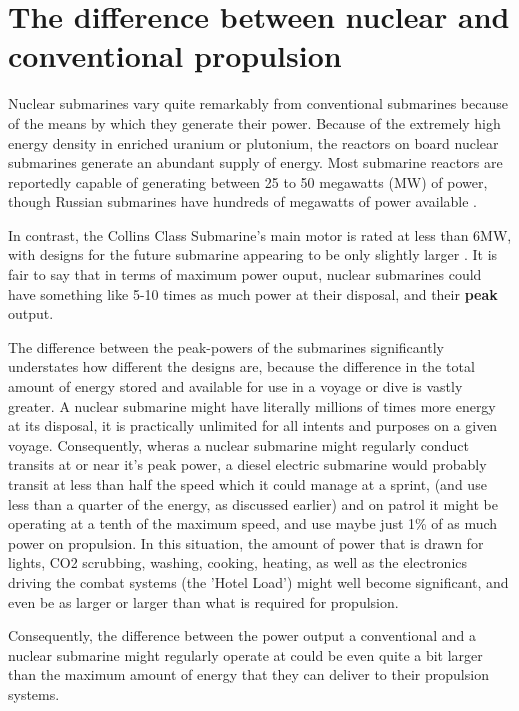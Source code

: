 \documentclass{article}\usepackage[]{graphicx}\usepackage[]{color}
\begin{document}
\section{The difference between nuclear and conventional propulsion}

Nuclear submarines vary quite remarkably from conventional submarines because of the means by which they generate their power.  Because of the extremely high energy density in enriched uranium or plutonium, the reactors on board nuclear submarines generate an abundant supply of energy.  Most submarine reactors are reportedly capable of generating between 25 to 50 megawatts (MW) of power, though Russian submarines have hundreds of megawatts of power available \parencite{WNA2017}.

In contrast, the Collins Class Submarine's main motor is rated at less than 6MW, with designs for the future submarine appearing to be only slightly larger \parencite{patrick2012}.  It is fair to say that in terms of maximum power ouput, nuclear submarines could have something like 5-10 times as much power at their disposal, and their \textbf{peak} output.

The difference between the peak-powers of the submarines significantly understates how different the designs are, because the difference in the total amount of energy stored and available for use in a voyage or dive is vastly greater.  A nuclear submarine might have literally millions of times more energy at its disposal, it is practically unlimited for all intents and purposes on a given voyage. Consequently, wheras a nuclear submarine might regularly conduct transits at or near it's peak power, a diesel electric submarine would probably transit at less than half the speed which it could manage at a sprint, (and use less than a quarter of the energy, as discussed earlier) and on patrol it might be operating at a tenth of the maximum speed, and use maybe just 1\% of as much power on propulsion. In this situation, the amount of power that is drawn for lights, CO2 scrubbing, washing, cooking, heating, as well as the electronics driving the combat systems (the 'Hotel Load') might well become significant, and even be as larger or larger than what is required for propulsion.

Consequently, the difference between the power output a conventional and a nuclear submarine might regularly operate at could be even quite a bit larger than the maximum amount of energy that they can deliver to their propulsion systems.
\end{document}
